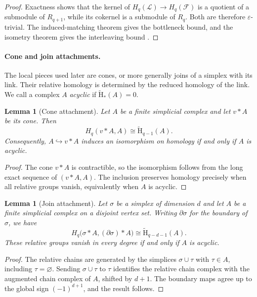 \documentclass[11pt,letterpaper]{article}
\newtheorem{lemma}[theorem]{Lemma}
\theoremstyle{definition}
\newcommand{\redH}{\widetilde{\mathrm H}}
\newcommand{\eps}{\varepsilon}
\begin{document}
\begin{proof}
Exactness shows that the kernel of
$H_q(\mathcal L)\to H_q(\mathcal F)$ is a quotient of a submodule of
$R_{q+1}$, while its cokernel is a submodule of $R_q$. Both are therefore
$\eps$-trivial. The induced-matching theorem
\cite[Theorem~6.1]{BauerLesnick2015} gives the bottleneck bound, and the
isometry theorem gives the interleaving bound \cite{ChazalEtAl2016}.
\end{proof}

\paragraph{Cone and join attachments.}
The local pieces used later are cones, or more generally joins of a simplex
with its link. Their relative homology is determined by the reduced homology
of the link. We call a complex $A$ \emph{acyclic} if $\redH_*(A)=0$.

\begin{lemma}[Cone attachment]
\label{lem:cone-attachment}
Let $A$ be a finite simplicial complex and let $v*A$ be its cone. Then
$$
H_q(v*A,A)\cong\redH_{q-1}(A).
$$
Consequently, $A\hookrightarrow v*A$ induces an isomorphism on homology if
and only if $A$ is acyclic.
\end{lemma}

\begin{proof}
The cone $v*A$ is contractible, so the isomorphism follows from the long exact
sequence of $(v*A,A)$. The inclusion preserves homology precisely when all
relative groups vanish, equivalently when $A$ is acyclic.
\end{proof}

\begin{lemma}[Join attachment]
\label{lem:join-pair}
Let $\sigma$ be a simplex of dimension $d$ and let $A$ be a finite simplicial
complex on a disjoint vertex set. Writing $\partial\sigma$ for the boundary of
$\sigma$, we have
$$
H_q\bigl(\sigma*A,(\partial\sigma)*A\bigr)
\cong\redH_{q-d-1}(A).
$$
These relative groups vanish in every degree if and only if $A$ is acyclic.
\end{lemma}

\begin{proof}
The relative chains are generated by the simplices $\sigma\cup\tau$ with
$\tau\in A$, including $\tau=\varnothing$. Sending $\sigma\cup\tau$ to
$\tau$ identifies the relative chain complex with the augmented chain complex
of $A$, shifted by $d+1$. The boundary maps agree up to the global sign
$(-1)^{d+1}$, and the result follows.
\end{proof}
\end{document}
